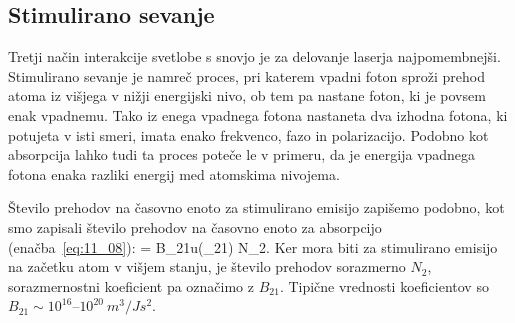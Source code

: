 \subsection*{Stimulirano sevanje}
Tretji način interakcije svetlobe s snovjo je za delovanje laserja
najpomembnejši. Stimulirano sevanje je namreč proces, pri katerem 
vpadni foton sproži prehod atoma iz višjega v nižji energijski nivo, 
ob tem pa nastane foton, ki je povsem enak vpadnemu.
Tako iz enega vpadnega fotona nastaneta dva izhodna fotona, ki potujeta
v isti smeri, imata enako frekvenco, fazo in polarizacijo. Podobno kot absorpcija
lahko tudi ta proces poteče le v primeru, da je energija vpadnega 
fotona enaka razliki energij med atomskima nivojema.

Število prehodov na časovno enoto za stimulirano emisijo zapišemo podobno, 
kot smo zapisali število prehodov na časovno enoto za absorpcijo 
(enačba~\ref{eq:11_08}): 
\beq
{} = B_{21}u(\omega_{21}) N_2.
\label{eq:11_12}
\eeq
Ker mora biti za stimulirano emisijo na začetku atom v višjem stanju, 
je število prehodov sorazmerno $N_2$, sorazmernostni koeficient pa 
označimo z $B_{21}$. Tipične vrednosti
koeficientov so $B_{21}\sim 10^{16}$--$10^{20}~\si{m^3/Js^2}$.

